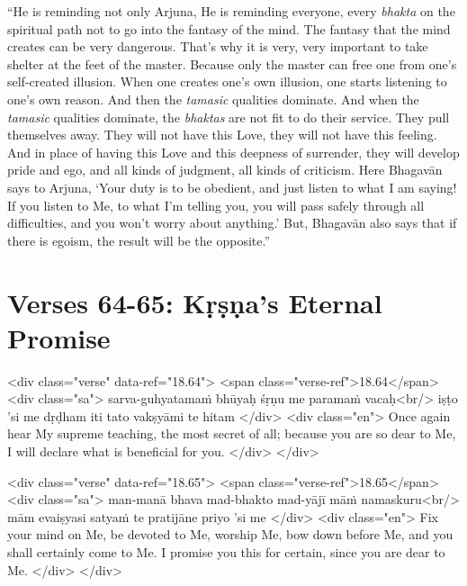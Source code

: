 \enquote{He is reminding not only Arjuna, He is reminding everyone, every \textit{bhakta} on the spiritual path not to go into the fantasy of the mind. The fantasy that the mind creates can be very dangerous. That’s why it is very, very important to take shelter at the feet of the master. Because only the master can free one from one’s self-created illusion. When one creates one’s own illusion, one starts listening to one’s own reason. And then the \textit{tamasic} qualities dominate. And when the \textit{tamasic} qualities dominate, the \textit{bhaktas} are not fit to do their service. They pull themselves away. They will not have this Love, they will not have this feeling. And in place of having this Love and this deepness of surrender, they will develop pride and ego, and all kinds of judgment, all kinds of criticism. Here Bhagavān says to Arjuna, \enquote{Your duty is to be obedient, and just listen to what I am saying! If you listen to Me, to what I’m telling you, you will pass safely through all difficulties, and you won’t worry about anything.} But, Bhagavān also says that if there is egoism, the result will be the opposite.}

\newpage

\section{Verses 64-65: Kṛṣṇa's Eternal Promise}\label{sec-verses-64-65-krsna-s-eternal-promise}


\begin{html}
<div class="verse" data-ref="18.64">
  <span class="verse-ref">18.64</span>
  <div class="sa">
    sarva-guhyatamaṁ bhūyaḥ śṛṇu me paramaṁ vacaḥ<br/>
    iṣṭo ’si me dṛḍham iti tato vakṣyāmi te hitam
  </div>
  <div class="en">
    Once again hear My supreme teaching, the most secret of all; because you are so dear to Me, I will declare what is beneficial for you.
  </div>
</div>
\end{html}



\begin{html}
<div class="verse" data-ref="18.65">
  <span class="verse-ref">18.65</span>
  <div class="sa">
    man-manā bhava mad-bhakto mad-yājī māṁ namaskuru<br/>
    mām evaiṣyasi satyaṁ te pratijāne priyo ’si me
  </div>
  <div class="en">
    Fix your mind on Me, be devoted to Me, worship Me, bow down before Me, and you shall certainly come to Me. I promise you this for certain, since you are dear to Me.
  </div>
</div>
\end{html}


